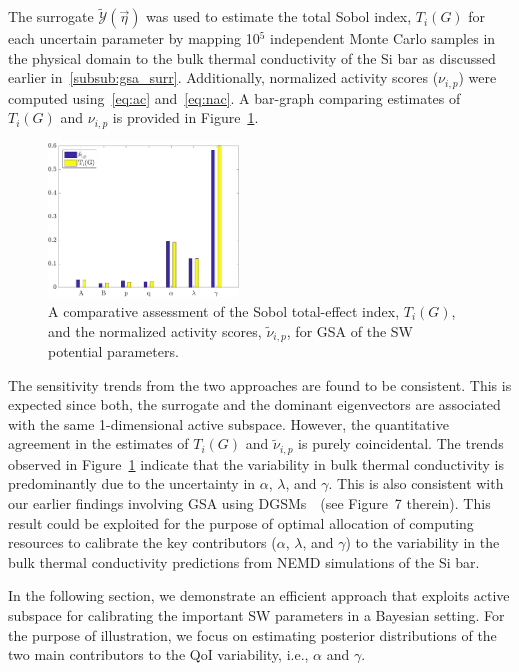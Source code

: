 The surrogate $\tilde{\mathcal{Y}}(\vec{\eta})$ was used to estimate the total Sobol index, $T_i(G)$ for each
uncertain parameter by mapping 10$^5$ independent Monte Carlo samples in the physical domain
to the bulk thermal conductivity of the Si bar as discussed earlier in~\ref{subsub:gsa_surr}. 
Additionally, normalized activity scores ($\nu_{i,p}$) were computed using~\eqref{eq:ac} and~\eqref{eq:nac}.
A bar-graph comparing estimates of $T_i(G)$ and $\nu_{i,p}$ is provided in
Figure~\ref{fig:gsa}. 
%
\begin{figure}[htbp]
\begin{center}
\includegraphics[width=0.45\textwidth]{./Figures/free_as_gsa}
\caption{A comparative assessment of the Sobol total-effect index, $T_i(G)$, and the normalized
activity scores, $\tilde{\nu}_{i,p}$, for GSA of the SW potential parameters.}
\label{fig:gsa}
\end{center}
\end{figure}
%
The sensitivity trends from the two approaches are found to be consistent. This is expected since
both, the surrogate and the dominant eigenvectors are associated with the same 1-dimensional active 
subspace. However, the quantitative agreement in the estimates of $T_i(G)$ and $\tilde{\nu}_{i,p}$
is purely coincidental. The trends observed in Figure~\ref{fig:gsa} indicate
 that the variability in bulk thermal conductivity is predominantly
due to the uncertainty in $\alpha$, $\lambda$, and $\gamma$. This is also consistent with our earlier
findings involving GSA using DGSMs~\cite{Vohra:2018b}~(see Figure~7 therein). 
This result could be exploited for the purpose of optimal allocation of computing resources to calibrate
the key contributors ($\alpha$, $\lambda$, and $\gamma$) to the variability in the bulk thermal conductivity
predictions from NEMD simulations of the Si bar. 

In the following section, we demonstrate an efficient approach that exploits active subspace for 
calibrating the important SW parameters in a Bayesian
setting. For the purpose of illustration, we focus on estimating posterior distributions of
 the two main contributors to the QoI variability, i.e.,
$\alpha$ and $\gamma$. 

